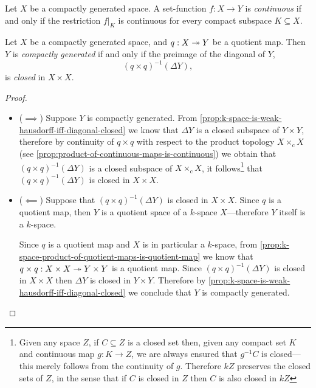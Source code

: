 \begin{lemma}
\label{lem:compactly-generated-cont-map-iff-restriction-to-cpct}
Let \(X\) be a compactly generated space. A set-function \(f: X \to Y\) is
\emph{continuous} if and only if the restriction \(f|_K\) is continuous for
every compact subspace \(K \subseteq X\).
\end{lemma}

\begin{proposition}
\label{prop:quotient-of-compactly-generated-space}
Let \(X\) be a compactly generated space, and \(q: X \twoheadrightarrow Y\) be a quotient
map. Then \(Y\) is \emph{compactly generated} if and only if the preimage of the
diagonal of \(Y\),
\[
(q \times q)^{-1}(\Delta Y),
\]
is \emph{closed} in \(X \times X\).
\end{proposition}

\begin{proof}
\begin{itemize}\setlength\itemsep{0em}
\item (\(\implies\)) Suppose \(Y\) is compactly generated. From
  \cref{prop:k-space-is-weak-hausdorff-iff-diagonal-closed} we know that
  \(\Delta Y\) is a closed subspace of \(Y \times Y\), therefore by continuity
  of \(q \times q\) with respect to the product topology
  \(X \times_{\text{c}} X\) (see
  \cref{prop:product-of-continuous-maps-is-continuous}) we obtain that
  \((q \times q)^{-1}(\Delta Y)\) is a closed subspace of
  \(X \times_{\text{c}} X\), it follows\footnote{ Given any space \(Z\), if
    \(C \subseteq Z\) is a closed set then, given any compact set \(K\) and
    continuous map \(g: K \to Z\), we are always ensured that \(g^{-1} C\) is
    closed---this merely follows from the continuity of \(g\). Therefore \(k Z\)
    preserves the closed sets of \(Z\), in the sense that if \(C\) is closed in
    \(Z\) then \(C\) is also closed in \(k Z\) } that
  \((q \times q)^{-1}(\Delta Y)\) is closed in \(X \times X\).

\item (\(\impliedby\)) Suppose that \((q \times q)^{-1}(\Delta Y)\) is closed in
  \(X \times X\). Since \(q\) is a quotient map, then \(Y\) is a quotient
  space of a \(k\)-space \(X\)---therefore \(Y\) itself is a \(k\)-space.

  Since \(q\) is a quotient map and \(X\) is in particular a \(k\)-space, from
  \cref{prop:k-space-product-of-quotient-maps-is-quotient-map} we know that
  \(q \times q: X \times X \twoheadrightarrow Y \times Y\) is a quotient map. Since
  \((q \times q)^{-1}(\Delta Y)\) is closed in \(X \times X\) then \(\Delta Y\)
  is closed in \(Y \times Y\). Therefore by
  \cref{prop:k-space-is-weak-hausdorff-iff-diagonal-closed} we conclude that
  \(Y\) is compactly generated.
\end{itemize}
\end{proof}

